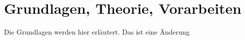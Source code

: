 \chapter{Grundlagen, Theorie, Vorarbeiten}\label{ch:ch2}
Die Grundlagen werden hier erläutert. Das ist eine Änderung


